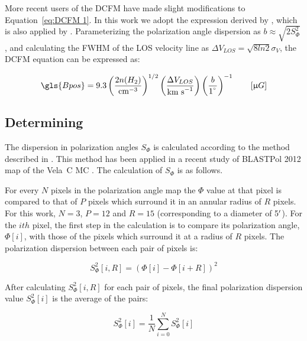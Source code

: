 More recent users of the DCFM have made slight modifications to Equation~\ref{eq:DCFM 1}. In this work we adopt the expression derived by \citet{hildebrand2009dispersion}, which is also applied by \citet{crutcher2004scuba,franco2015tracing}. Parameterizing the polarization angle dispersion as $b \approx \sqrt{2 S^{2}_{\Phi}}$ \citep{houde2009dispersion}, and calculating the FWHM of the LOS velocity line as $\Delta V_{LOS} = \sqrt{8 ln 2} \sigma_{V}$, the DCFM equation can be expressed as:

 \begin{equation}\label{eq:DCFM 2}
    \gls{Bpos} = 9.3 \left( \frac{2n(H_{2})}{\text{cm}^{-3}}  \right)^{1/2} \left( \frac{\Delta V_{{LOS}}}{\text{km s}^{-1}} \right)  \left(  \frac{b}{1^{\degree}}\right)^{-1} \qquad \left[ \upmu G \right]
 \end{equation}

\subsection{Determining }\label{pol disp}

The dispersion in polarization angles $S_{\Phi}$ is calculated according to the method described in \citet{ade2015planck}. This method has been applied in a recent study of BLASTPol 2012 map of the Vela~C MC \citep{fissel2016balloon}. The calculation of $S_{\Phi}$ is as follows.

For every $N$ pixels in the polarization angle map the $\Phi$ value at that pixel is compared to that of $P$ pixels which surround it in an annular radius of $R$ pixels. For this work, $N = 3$, $P = 12$ and $R = 15$ (corresponding to a diameter of 5$\operatorname{^{\prime}}$). For the $ith$ pixel, the first step in the calculation is to compare its polarization angle, $\Phi[i]$, with those of the pixels which surround it at a radius of $R$ pixels. The polarization dispersion between each pair of pixels is:

\begin{equation}
  S^{2}_{\Phi}[i,R] = \left( \Phi[i] - \Phi[i + R] \right)^{2}
\end{equation}

After calculating $S^{2}_{\Phi}[i,R]$ for each pair of pixels, the final polarization dispersion value $S^{2}_{\Phi}[i]$ is the average of the pairs:

\begin{equation}
  S^{2}_{\Phi}[i] = \frac{1}{N} \sum\limits_{i=0}^{N} S^{2}_{\Phi}[i]
\end{equation}

